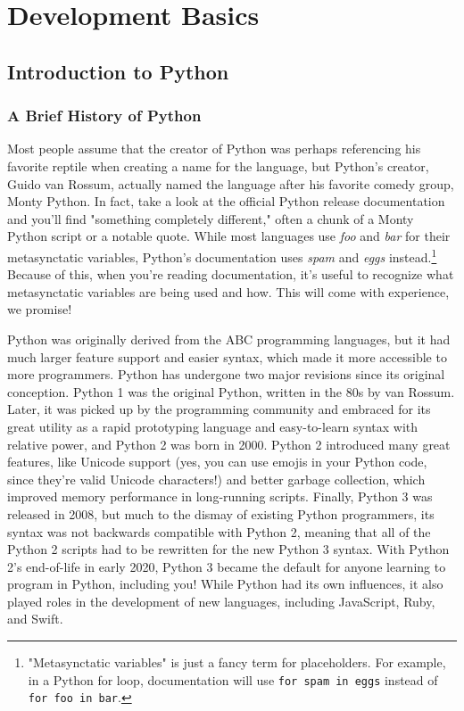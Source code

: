 \chapter{Development Basics}
\section{Introduction to Python}
\subsection{A Brief History of Python}
Most people assume that the creator of Python was perhaps referencing his favorite reptile when creating a name for the language, but Python's creator, Guido van Rossum, actually named the language after his favorite comedy group, Monty Python. In fact, take a look at the official Python release documentation and you'll find "something completely different," often a chunk of a Monty Python script or a notable quote. While most languages use \textit{foo} and \textit{bar} for their metasynctatic variables, Python's documentation uses \textit{spam} and \textit{eggs} instead.\cprotect\footnote{"Metasynctatic variables" is just a fancy term for placeholders. For example, in a Python for loop, documentation will use \verb|for spam in eggs| instead of \verb|for foo in bar|.} Because of this, when you're reading documentation, it's useful to recognize what metasynctatic variables are being used and how. This will come with experience, we promise!\par
Python was originally derived from the ABC programming languages, but it had much larger feature support and easier syntax, which made it more accessible to more programmers. Python has undergone two major revisions since its original conception. Python 1 was the original Python, written in the 80s by van Rossum. Later, it was picked up by the programming community and embraced for its great utility as a rapid prototyping language and easy-to-learn syntax with relative power, and Python 2 was born in 2000. Python 2 introduced many great features, like Unicode support (yes, you can use emojis in your Python code, since they're valid Unicode characters!) and better garbage collection, which improved memory performance in long-running scripts. Finally, Python 3 was released in 2008, but much to the dismay of existing Python programmers, its syntax was not backwards compatible with Python 2, meaning that all of the Python 2 scripts had to be rewritten for the new Python 3 syntax. With Python 2's end-of-life in early 2020, Python 3 became the default for anyone learning to program in Python, including you!
While Python had its own influences, it also played roles in the development of new languages, including JavaScript, Ruby, and Swift.\par
